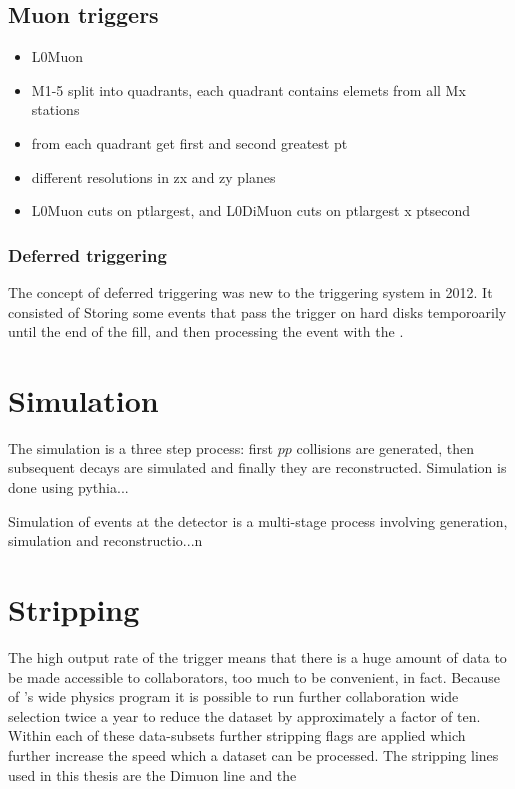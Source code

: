 \subsection{Muon triggers}
\begin{itemize}
  \item L0Muon
  \item M1-5 split into quadrants, each quadrant contains elemets from all Mx stations
  \item from each quadrant get first and second greatest pt
  \item different resolutions in zx and zy planes
  \item L0Muon cuts on ptlargest, and L0DiMuon cuts on ptlargest x ptsecond
\end{itemize}


\subsubsection{Deferred triggering}
The concept of deferred triggering was new to the \lhcb triggering system in 2012.
It consisted of Storing some events that pass the \lone trigger on hard disks temporoarily until
the end of the fill, and then processing the event with the \hlt.



\section{Simulation}
The \lhcb simulation is a three step process: first $pp$ collisions are generated, then subsequent
decays are simulated and finally they are reconstructed.
Simulation is done using pythia...


Simulation of events at the \lhcb  detector is a multi-stage process involving generation,
simulation and reconstructio...n



\section{Stripping}
The high output rate of the \lhcb trigger means that there is a huge amount of data to be made
accessible to collaborators, too much to be convenient, in fact.
Because of \lhcb's wide physics program it is possible to run further collaboration wide selection
twice a year to reduce the dataset by approximately a factor of ten.
Within each of these data-subsets further stripping flags are applied which further increase the
speed which a dataset can be processed.
The stripping lines used in this thesis are the Dimuon line and the





